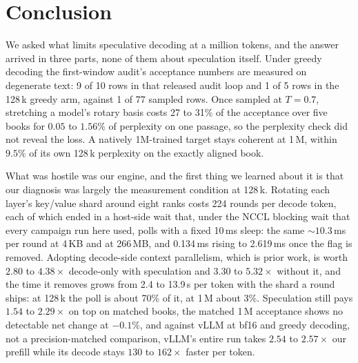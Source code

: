 \documentclass{article}
\begin{document}
\section{Conclusion}
\label{sec:conclusion}

We asked what limits speculative decoding at a million tokens, and the answer arrived in three
parts, none of them about speculation itself. Under greedy decoding the first-window audit's
acceptance numbers are measured on degenerate text: 9 of 10 rows in that released audit loop
and 1 of 5 rows in the 128\,k greedy arm, against 1 of 77 sampled rows. Once sampled at
$T{=}0.7$, stretching a model's rotary basis costs 27 to 31\% of the acceptance over five books
for $0.05$ to $1.56\%$ of perplexity on one passage, so the perplexity check did not reveal the
loss. A natively 1M-trained target stays coherent at 1\,M, within $9.5\%$ of its own 128\,k
perplexity on the exactly aligned book.

What was hostile was our engine, and the first thing we learned about it is that our diagnosis
was largely the measurement condition at 128\,k. Rotating each layer's key/value shard around
eight ranks costs
224 rounds per decode token, each of which ended in a host-side wait that, under the NCCL
blocking wait that every campaign run here used, polls with a fixed 10\,ms sleep: the same
${\sim}10.3$\,ms per round at 4\,KB and at 266\,MB, and 0.134\,ms rising to 2.619\,ms once
the flag is removed. Adopting decode-side context parallelism, which is prior work, is worth
$2.80$ to $4.38\times$ decode-only with speculation and $3.30$ to $5.32\times$ without it, and
the time it removes grows from 2.4 to 13.9\,s per token with the shard a round ships: at
128\,k the poll is about 70\% of it, at 1\,M about 3\%. Speculation still pays $1.54$ to
$2.29\times$ on top on matched books, the matched 1\,M acceptance shows no detectable net
change at $-0.1\%$, and against vLLM at bf16 and greedy decoding, not a precision-matched
comparison, vLLM's entire run takes $2.54$ to $2.57\times$ our prefill while its decode stays
$130$ to $162\times$ faster per token.

\clearpage


\end{document}
